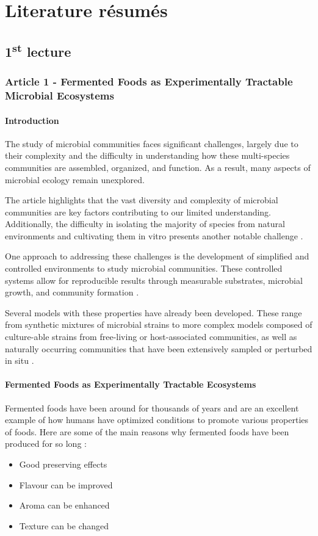 \chapter{Literature résumés}

\section{1\textsuperscript{st} lecture}
\subsection{Article 1 - Fermented Foods as Experimentally Tractable Microbial Ecosystems}
\subsubsection*{Introduction}
The study of microbial communities faces significant challenges, largely due to their complexity and the difficulty in understanding how these multi-species communities are assembled, organized, and function. As a result, many aspects of microbial ecology remain unexplored.

The article highlights that the vast diversity and complexity of microbial communities are key factors contributing to our limited understanding. Additionally, the difficulty in isolating the majority of species from natural environments and cultivating them in vitro presents another notable challenge \cite*{L1-FermentedFoods}.

One approach to addressing these challenges is the development of simplified and controlled environments to study microbial communities. These controlled systems allow for reproducible results through measurable substrates, microbial growth, and community formation \cite*{L1-FermentedFoods}.

Several models with these properties have already been developed. These range from synthetic mixtures of microbial strains to more complex models composed of culture-able strains from free-living or host-associated communities, as well as naturally occurring communities that have been extensively sampled or perturbed in situ \cite*{L1-FermentedFoods}.

\subsubsection*{Fermented Foods as Experimentally Tractable Ecosystems}
Fermented foods have been around for thousands of years and are an excellent example of how humans have optimized conditions to promote various properties of foods. Here are some of the main reasons why fermented foods have been produced for so long \cite*{L1-FermentedFoods}:
\begin{highlight}
    \begin{itemize}
    \item Good preserving effects
    \item Flavour can be improved
    \item Aroma can be enhanced
    \item Texture can be changed
    \end{itemize}
\end{highlight}

